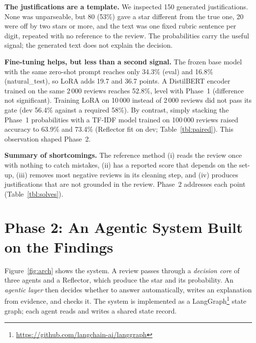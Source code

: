 \documentclass[runningheads]{llncs}
\begin{document}
\textbf{The justifications are a template.} We inspected 150 generated justifications. None was unparseable, but 80 (53\%) gave a star different from the true one, 20 were off by two stars or more, and the text was one fixed rubric sentence per digit, repeated with no reference to the review. The probabilities carry the useful signal; the generated text does not explain the decision.

\textbf{Fine-tuning helps, but less than a second signal.} The frozen base model with the same zero-shot prompt reaches only 34.3\% (eval) and 16.8\% (natural\_test), so LoRA adds 19.7 and 36.7 points. A DistilBERT encoder \cite{sanh2019distilbert} trained on the same 2\,000 reviews reaches 52.8\%, level with Phase~1 (difference not significant). Training LoRA on 10\,000 instead of 2\,000 reviews did not pass its gate (dev 56.4\% against a required 58\%). By contrast, simply stacking the Phase~1 probabilities with a TF-IDF model trained on 100\,000 reviews raised accuracy to 63.9\% and 73.4\% (Reflector fit on dev; Table~\ref{tbl:paired}). This observation shaped Phase~2.

\textbf{Summary of shortcomings.} The reference method (i) reads the review once with nothing to catch mistakes, (ii) has a reported score that depends on the set-up, (iii) removes most negative reviews in its cleaning step, and (iv) produces justifications that are not grounded in the review. Phase~2 addresses each point (Table~\ref{tbl:solves}).

\section{Phase 2: An Agentic System Built on the Findings}
\label{sec:phase2}

Figure~\ref{fig:arch} shows the system. A review passes through a \emph{decision core} of three agents and a Reflector, which produce the star and its probability. An \emph{agentic layer} then decides whether to answer automatically, writes an explanation from evidence, and checks it. The system is implemented as a LangGraph\footnote{\url{https://github.com/langchain-ai/langgraph}} state graph; each agent reads and writes a shared state record.
\end{document}
